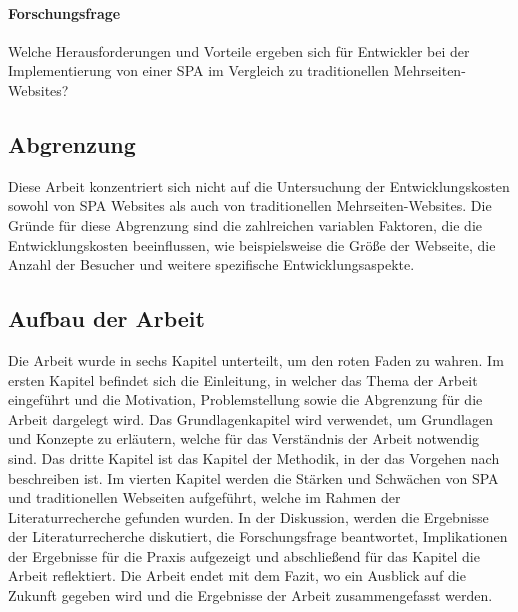 \paragraph*{Forschungsfrage}
Welche Herausforderungen und Vorteile ergeben sich für Entwickler bei der Implementierung von einer \ac{SPA} im Vergleich zu traditionellen Mehrseiten-Websites?

\subsection{Abgrenzung}
Diese Arbeit konzentriert sich nicht auf die Untersuchung der Entwicklungskosten sowohl von \ac{SPA} Websites als auch von traditionellen Mehrseiten-Websites. 
Die Gründe für diese Abgrenzung sind die zahlreichen variablen Faktoren, die die Entwicklungskosten beeinflussen, wie beispielsweise die Größe der Webseite, die Anzahl der Besucher und weitere spezifische Entwicklungsaspekte.
\subsection{Aufbau der Arbeit}

Die Arbeit wurde in sechs Kapitel unterteilt, um den roten Faden zu wahren.
Im ersten Kapitel befindet sich die Einleitung, in welcher das Thema der Arbeit eingeführt und die Motivation, Problemstellung sowie die Abgrenzung für die Arbeit dargelegt wird.
Das Grundlagenkapitel wird verwendet, um Grundlagen und Konzepte zu erläutern, welche für das Verständnis der Arbeit notwendig sind.
Das dritte Kapitel ist das Kapitel der Methodik, in der das Vorgehen nach  beschreiben ist.
Im vierten Kapitel werden die Stärken und Schwächen von \ac{SPA} und traditionellen Webseiten aufgeführt, welche im Rahmen der Literaturrecherche gefunden wurden.
In der Diskussion, werden die Ergebnisse der Literaturrecherche diskutiert, die Forschungsfrage beantwortet, Implikationen der Ergebnisse für die Praxis aufgezeigt und abschließend für das Kapitel die Arbeit reflektiert.
Die Arbeit endet mit dem Fazit, wo ein Ausblick auf die Zukunft gegeben wird und die Ergebnisse der Arbeit zusammengefasst werden.
